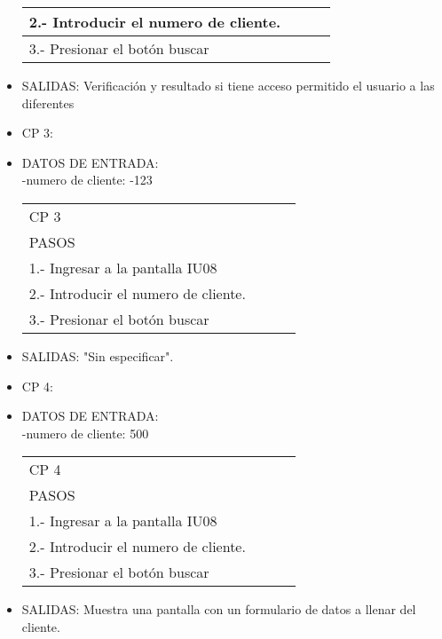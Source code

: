 \begin{itemize}
\begin{center}
\begin{tabular}{|l|l|l|l|}
		\hline 2.- Introducir el numero de cliente.\\
		\hline 3.- Presionar el botón buscar\\
		\hline
	\end{tabular}
\end{center}
\item SALIDAS: Verificación y resultado si tiene acceso permitido el usuario a las diferentes 
\item CP 3:
\item DATOS DE ENTRADA:\\
-numero de cliente: -123\\
\begin{center}			
	\begin{tabular}{|l|l|l|l|}
		\hline
		CP 3\\
		PASOS\\
		\hline 1.- Ingresar a la pantalla IU08\\
		\hline 2.- Introducir el numero de cliente.\\
		\hline 3.- Presionar el botón buscar\\
		\hline
	\end{tabular}
\end{center}
\item SALIDAS: "Sin especificar".
\item CP 4:
\item DATOS DE ENTRADA:\\
-numero de cliente: 500\\
\begin{center}			
	\begin{tabular}{|l|l|l|l|}
		\hline
		CP 4\\
		PASOS\\
		\hline 1.- Ingresar a la pantalla IU08\\
		\hline 2.- Introducir el numero de cliente.\\
		\hline 3.- Presionar el botón buscar\\
		\hline
	\end{tabular}
\end{center}
\item SALIDAS: Muestra una pantalla con un formulario de datos a llenar del cliente.
\end{itemize}
